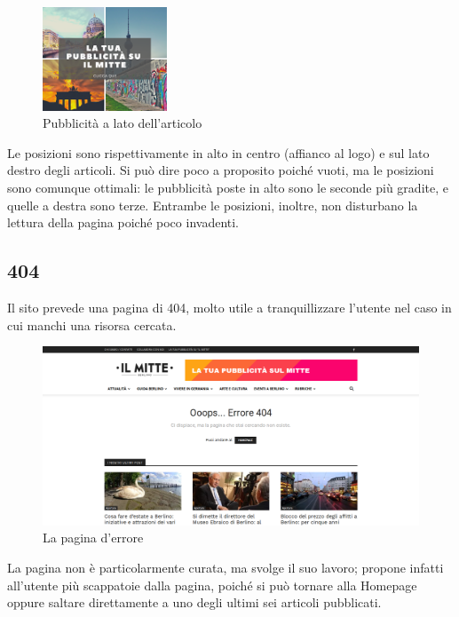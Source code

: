 \begin{figure}[htbp]
\begin{center}
\includegraphics[width=10em]{img/pubblicita2}
\caption{Pubblicità a lato dell'articolo}
\end{center}
\end{figure}
\vspace{30pt}

Le posizioni sono rispettivamente in alto in centro (affianco al logo) e sul lato destro degli articoli. Si può dire poco a proposito poiché vuoti, ma le posizioni sono comunque ottimali: le pubblicità poste in alto sono le seconde più gradite, e quelle a destra sono terze. Entrambe le posizioni, inoltre, non disturbano la lettura della pagina poiché poco invadenti.

\subsection{404}
Il sito prevede una pagina di 404, molto utile a tranquillizzare l'utente nel caso in cui manchi una risorsa cercata.

\vspace{30pt}
\begin{figure}[htbp]
\begin{center}
\includegraphics[width=35em]{img/404}
\caption{La pagina d'errore}
\end{center}
\end{figure}
\vspace{30pt}

La pagina non è particolarmente curata, ma svolge il suo lavoro; propone infatti all'utente più scappatoie dalla pagina, poiché si può tornare alla Homepage oppure saltare direttamente a uno degli ultimi sei articoli pubblicati.